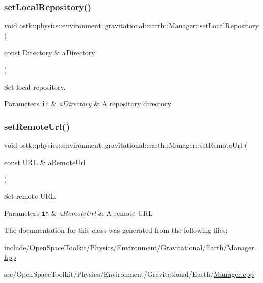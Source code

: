 \subsubsection{\texorpdfstring{set\+Local\+Repository()}{setLocalRepository()}}
{\footnotesize\ttfamily void ostk\+::physics\+::environment\+::gravitational\+::earth\+::\+Manager\+::set\+Local\+Repository (\begin{DoxyParamCaption}\item[{const Directory \&}]{a\+Directory }\end{DoxyParamCaption})}



Set local repository. 


\begin{DoxyParams}[1]{Parameters}
\mbox{\tt in}  & {\em a\+Directory} & A repository directory \\
\hline
\end{DoxyParams}
\mbox{\label{classostk_1_1physics_1_1environment_1_1gravitational_1_1earth_1_1_manager_a3b935a28445b47e23e59141e5d3f6f2e}} 
\subsubsection{\texorpdfstring{set\+Remote\+Url()}{setRemoteUrl()}}
{\footnotesize\ttfamily void ostk\+::physics\+::environment\+::gravitational\+::earth\+::\+Manager\+::set\+Remote\+Url (\begin{DoxyParamCaption}\item[{const U\+RL \&}]{a\+Remote\+Url }\end{DoxyParamCaption})}



Set remote U\+RL. 


\begin{DoxyParams}[1]{Parameters}
\mbox{\tt in}  & {\em a\+Remote\+Url} & A remote U\+RL \\
\hline
\end{DoxyParams}


The documentation for this class was generated from the following files\+:\begin{DoxyCompactItemize}
\item 
include/\+Open\+Space\+Toolkit/\+Physics/\+Environment/\+Gravitational/\+Earth/\hyperlink{_environment_2_gravitational_2_earth_2_manager_8hpp}{Manager.\+hpp}\item 
src/\+Open\+Space\+Toolkit/\+Physics/\+Environment/\+Gravitational/\+Earth/\hyperlink{_environment_2_gravitational_2_earth_2_manager_8cpp}{Manager.\+cpp}\end{DoxyCompactItemize}
